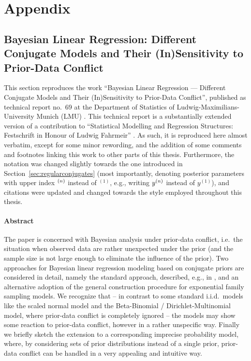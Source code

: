\chapter{Appendix}


\section{Bayesian Linear Regression: Different Conjugate Models and Their (In)Sensi\-ti\-vi\-ty to Prior-Data Conflict}
\label{sec:festschrift}

This section reproduces the work
``Bayesian Linear Regression --- Different Conjugate Models and Their (In)Sensitivity to Prior-Data Conflict'',
published as technical report no.~69 at the Department of Statistics of Ludwig-Maximilians-University Munich (LMU)
\parencite{Walter2009b}. This technical report is a substantially extended version of a contribution to
``Statistical Modelling and Regression Structures: Festschrift in Honour of Ludwig Fahrmeir'' \parencite{Walter2010a}.
As such, it is reproduced here almost verbatim, except for some minor rewording,
and the addition of some comments and footnotes linking this work to other parts of this thesis.
Furthermore, the notation was changed slightly towards the one introduced in Section~\ref{sec:regularconjugates}
(most importantly, denoting posterior parameters with upper index ${}^{(n)}$ instead of ${}^{(1)}$,
e.g., writing $y^{(n)}$ instead of $y^{(1)}$),
and citations were updated and changed towards the style employed throughout this thesis.

\subsubsection*{Abstract}

The paper is concerned with Bayesian analysis under
prior-data conflict, i.e.\ the situation when observed data are
rather unexpected under the prior (and the sample size is not large
enough to eliminate the influence of the prior). Two approaches for
Bayesian linear regression modeling based on conjugate priors are
considered in detail, namely the standard approach, described, e.g., in
\textcite{2013:fahrmeier-kneib-lang-marx}, and an alternative adoption of the
general construction procedure for exponential family sampling
models. We recognize that -- in contrast to some standard i.i.d.\
models like the scaled normal model and the Beta-Binomial /
Dirichlet-Multinomial model, where prior-data conflict is completely
ignored -- the models may show some reaction to prior-data conflict,
however in a rather unspecific way. Finally we briefly sketch the
extension to a corresponding imprecise probability model, where,
by considering sets of prior distributions instead of a single prior,
prior-data conflict can be handled in a very appealing and intuitive way.


